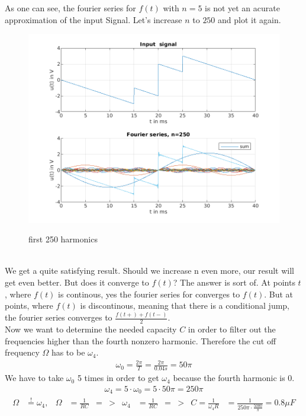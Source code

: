 \documentclass[a4paper]{article}
\begin{document}
\clearpage
As one can see, the fourier series for $f(t)$ with $n=5$ is not yet an acurate approximation of
the input Signal. Let's increase $n$ to  $250$ and plot it again. 
\begin{figure}[h!] \centering
  \includegraphics{"./Figures/fourier_n250.png"}
  \label{fig:fourier250}
  \caption{first 250 harmonics}
\end{figure}
\\ We get a quite satisfying result. Should we increase n even more, our result will get even better.
But does it converge to $f(t)$? The answer is sort of. At points $t$, where  $f(t)$ is continous,
yes the fourier series for converges to $f(t)$. But at points, where $f(t)$ is discontinous, meaning
that there is a conditional jump, the fourier series converges to  $\frac{f(t+) + f(t-)}{2}$.
\\
Now we want to determine the needed capacity $C$ in order to filter out the frequencies higher than the fourth nonzero harmonic.
Therefore the cut off frequency $\Omega$ has to be $\omega_4$.
\begin{align*}
	\omega_0 = \frac{2\pi}{T} = \frac{2\pi}{0.04s} = 50\pi
\end{align*}
We have to take $\omega_0$ 5 times in order to get $\omega_4$ because the fourth harmonic is 0.
\begin{align*}
	\omega_4 = 5 \cdot \omega_0 = 5 \cdot 50\pi = 250\pi
\end{align*}
\begin{align*}
	\Omega &\overset{!}{=} \omega_4,& \Omega &= \frac{1}{RC}& =&>& \omega_4 &= \frac{1}{RC}& =&>& 
	C = \frac{1}{\omega_4R} &= \frac{1}{250\pi \cdot \frac{5000}{\pi}} = 0.8\mu F \\
\end{align*}
\end{document}
